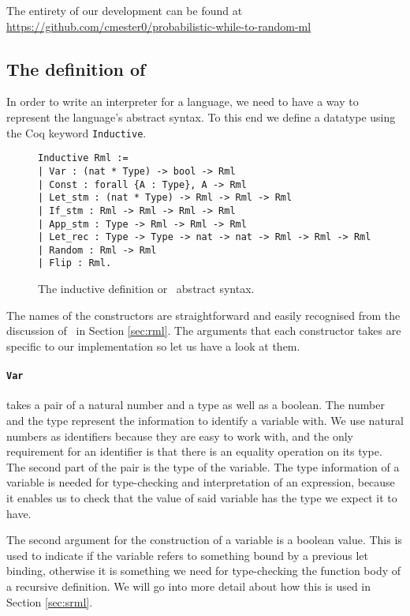 \documentclass[11pt, leqno, titlepage]{article}
\def\coqe{\lstinline[language=Coq, basicstyle=\small]}
\theoremstyle{definition}
\begin{document}
The entirety of our development can be found at \url{https://github.com/cmester0/probabilistic-while-to-random-ml}

\subsection{The definition of \rmlx}
\label{sec:rmlx}

In order to write an interpreter for a language, we need to have a way to represent
the language's abstract syntax. To this end we define a datatype using the Coq
keyword \coqe{Inductive}. 

\begin{figure}[h]
  \centering
  \begin{minipage}{0.8\linewidth}
    \begin{lstlisting}[language=coq]
Inductive Rml :=
| Var : (nat * Type) -> bool -> Rml 
| Const : forall {A : Type}, A -> Rml
| Let_stm : (nat * Type) -> Rml -> Rml -> Rml
| If_stm : Rml -> Rml -> Rml -> Rml
| App_stm : Type -> Rml -> Rml -> Rml
| Let_rec : Type -> Type -> nat -> nat -> Rml -> Rml -> Rml
| Random : Rml -> Rml
| Flip : Rml.
    \end{lstlisting}
  \end{minipage}
  \caption{The inductive definition or \rmlx\ abstract syntax.}
  \label{fig:rmlx}
\end{figure}


The names of the constructors are straightforward and easily recognised from the
discussion of \rml\ in Section \ref{sec:rml}. The arguments that each constructor
takes are specific to our implementation so let us have a look at them.

\paragraph{\coqe{Var}} takes a pair of a natural number and a type as well as a boolean. 
The number and the type represent the information to identify a variable with. We use
natural numbers as identifiers because they are easy to work with, and the only
requirement for an identifier is that there is an equality operation on its type. The
second part of the pair is the type of the variable. The type information of a
variable is needed for type-checking and interpretation of an expression, because it
enables us to check that the value of said variable has the type we expect it to
have.

The second argument for the construction of a variable is a boolean value. This is
used to indicate if the variable refers to something bound by a previous let binding,
otherwise it is something we need for type-checking the function body of a recursive
definition. We will go into more detail about how this is used in Section \ref{sec:srml}.
\end{document}
